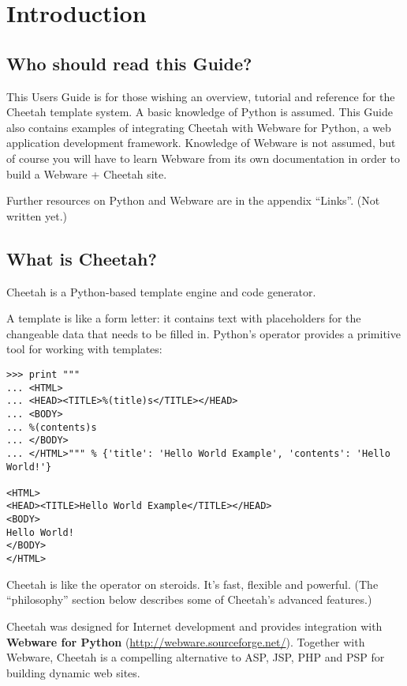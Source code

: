 \section{Introduction}
\label{intro}


\subsection{Who should read this Guide?}

This Users Guide is for those wishing an overview, tutorial and reference for
the Cheetah template system.  A basic knowledge of Python is assumed.
This Guide also contains examples of integrating Cheetah with Webware for
Python, a web application development framework.  Knowledge of Webware is not
assumed, but of course you will have to learn Webware from its own 
documentation in order to build a Webware + Cheetah site.

Further resources on Python and Webware are in the appendix ``Links''.
(Not written yet.)

\subsection{What is Cheetah?}
\label{intro.whatIs}

Cheetah is a Python-based template engine and code generator.  

A template is like a form letter: it contains text with placeholders for the
changeable data that needs to be filled in.  Python's \code{\%} operator
provides a primitive tool for working with templates:

\begin{verbatim}
>>> print """
... <HTML>
... <HEAD><TITLE>%(title)s</TITLE></HEAD>
... <BODY>
... %(contents)s
... </BODY>
... </HTML>""" % {'title': 'Hello World Example', 'contents': 'Hello World!'}

<HTML>
<HEAD><TITLE>Hello World Example</TITLE></HEAD>
<BODY>
Hello World!
</BODY>
</HTML>
\end{verbatim}

Cheetah is like the \code{\%} operator on steroids.  It's fast, flexible and
powerful.  (The ``philosophy'' section below describes some of Cheetah's
advanced features.) 

Cheetah was designed for Internet development and provides integration with
{\bf Webware for Python} (\url{http://webware.sourceforge.net/}).  Together
with Webware, Cheetah is a compelling alternative to ASP, JSP, PHP and PSP for
building dynamic web sites.

